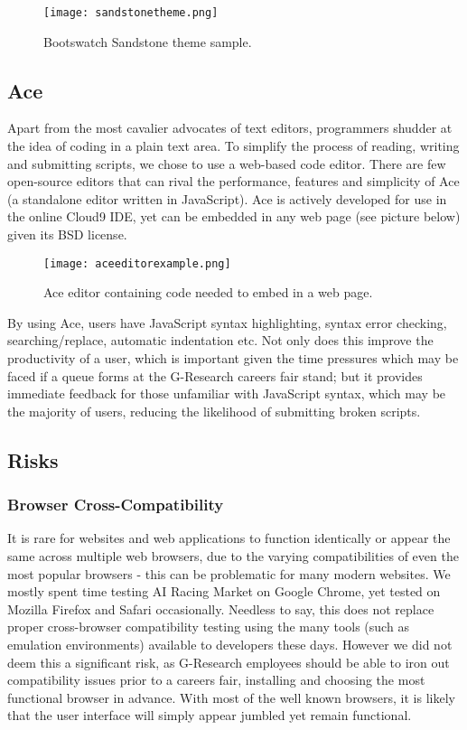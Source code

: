 \begin{figure}[H]
\centering
\texttt{[image: sandstonetheme.png]}
\caption{Bootswatch Sandstone theme sample.}
\end{figure}

\subsection{Ace}
Apart from the most cavalier advocates of text editors, programmers shudder at the idea of coding in a plain text area. To simplify the process of reading, writing and submitting scripts, we chose to use a web-based code editor. There are few open-source editors that can rival the performance, features and simplicity of Ace (a standalone editor written in JavaScript). Ace\cite{ace} is actively developed for use in the online Cloud9 IDE, yet can be embedded in any web page (see picture below) given its BSD license.

\begin{figure}[H]
\centering
\texttt{[image: aceeditorexample.png]}
\caption{Ace editor containing code needed to embed in a web page.}
\end{figure}

\noindent By using Ace, users have JavaScript syntax highlighting, syntax error checking, searching/replace, automatic indentation etc. Not only does this improve the productivity of a user, which is important given the time pressures which may be faced if a queue forms at the G-Research careers fair stand; but it provides immediate feedback for those unfamiliar with JavaScript syntax, which may be the majority of users, reducing the likelihood of submitting broken scripts.

\subsection{Risks}

\subsubsection{Browser Cross-Compatibility}

It is rare for websites and web applications to function identically or appear the same across multiple web browsers, due to the varying compatibilities of even the most popular browsers - this can be problematic for many modern websites. We mostly spent time testing AI Racing Market on Google Chrome, yet tested on Mozilla Firefox and Safari occasionally. Needless to say, this does not replace proper cross-browser compatibility testing using the many tools (such as emulation environments) available to developers these days. However we did not deem this a significant risk, as G-Research employees should be able to iron out compatibility issues prior to a careers fair, installing and choosing the most functional browser in advance. With most of the well known browsers, it is likely that the user interface will simply appear jumbled yet remain functional.

